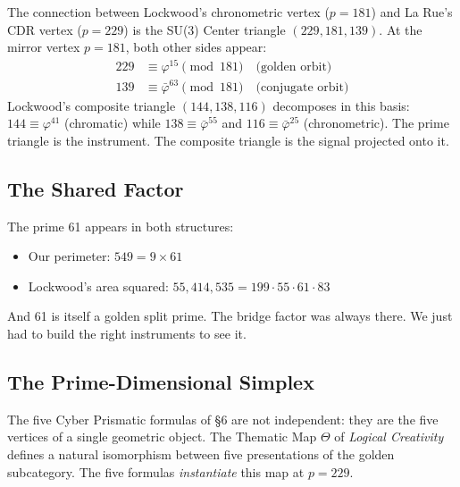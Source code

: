 \documentclass[12pt,oneside]{article}
\theoremstyle{principia}
\theoremstyle{definition}
\theoremstyle{remark}
\providecommand{\vp}{\varphi}
\providecommand{\vpbar}{\bar{\varphi}}
\begin{document}
The connection between Lockwood's chronometric vertex ($p = 181$) and La Rue's CDR vertex ($p = 229$) is the SU(3) Center triangle $(229, 181, 139)$. At the mirror vertex $p = 181$, both other sides appear:
\begin{align}
229 &\equiv \vp^{15} \pmod{181} \quad \text{(golden orbit)} \\
139 &\equiv \vpbar^{63} \pmod{181} \quad \text{(conjugate orbit)}
\end{align}
Lockwood's composite triangle $(144, 138, 116)$ decomposes in this basis: $144 \equiv \vp^{41}$ (chromatic) while $138 \equiv \vpbar^{55}$ and $116 \equiv \vpbar^{25}$ (chronometric). The prime triangle is the instrument. The composite triangle is the signal projected onto it.

\subsection{The Shared Factor}

The prime 61 appears in both structures:
\begin{itemize}
\item Our perimeter: $549 = 9 \times 61$
\item Lockwood's area squared: $55{,}414{,}535 = 199 \cdot 55 \cdot 61 \cdot 83$
\end{itemize}
And 61 is itself a golden split prime. The bridge factor was always there. We just had to build the right instruments to see it.


\subsection{The Prime-Dimensional Simplex}

The five Cyber Prismatic formulas of \S6 are not independent: they are the five vertices of a single geometric object. The Thematic Map $\Theta$ of \emph{Logical Creativity}~\cite{larue_lc} defines a natural isomorphism between five presentations of the golden subcategory. The five formulas \emph{instantiate} this map at $p = 229$.
\end{document}
